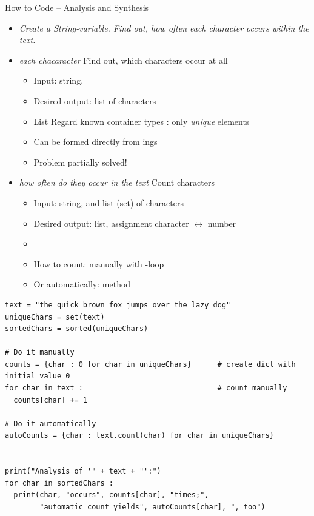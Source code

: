 \begin{frame}[fragile]{How to Code -- Analysis and Synthesis}
%
\begin{itemize}
\item \emph{Create a String-variable. Find out, how often each character occurs within the text.}
\item \emph{each chacaracter} \Thus Find out, which characters occur at all
	\begin{itemize}
	\item Input: string.
	\item Desired output: list of characters
	\item List \Thus Regard known container types \Thus {}: only \emph{unique} elements
	\item Can be formed directly from ings
	\item[\Thus] Problem partially solved!
	\end{itemize}
\item \emph{how often do they occur in the text} \Thus Count characters
	\begin{itemize}
	\item Input: string, and list (set) of characters
	\item Desired output: list, assignment character $\leftrightarrow$ number
	\item[\Thus] 
	\item How to count: manually with -loop
	\item Or automatically: method 
	\end{itemize}
\end{itemize}
%
\end{frame}


\begin{frame}[fragile]
%
%
\begin{codebox}
\begin{verbatim}
text = "the quick brown fox jumps over the lazy dog"
uniqueChars = set(text)
sortedChars = sorted(uniqueChars)

# Do it manually
counts = {char : 0 for char in uniqueChars}      # create dict with initial value 0
for char in text :                               # count manually
  counts[char] += 1

# Do it automatically
autoCounts = {char : text.count(char) for char in uniqueChars}


print("Analysis of '" + text + "':")
for char in sortedChars :
  print(char, "occurs", counts[char], "times;",
        "automatic count yields", autoCounts[char], ", too")
\end{verbatim}
\end{codebox}
%
\end{frame}

